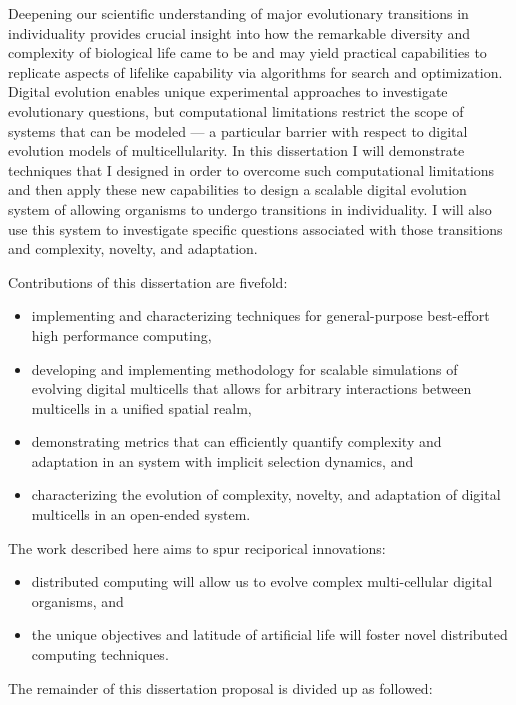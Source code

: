 Deepening our scientific understanding of major evolutionary transitions in individuality provides crucial insight into how the remarkable diversity and complexity of biological life came to be and may yield practical capabilities to replicate aspects of lifelike capability via algorithms for search and optimization.
Digital evolution enables unique experimental approaches to investigate evolutionary questions, but computational limitations restrict the scope of systems that can be modeled --- a particular barrier with respect to digital evolution models of multicellularity.
In this dissertation I will demonstrate techniques that I designed in order to overcome such computational limitations and then apply these new capabilities to design a scalable digital evolution system of allowing organisms to undergo transitions in individuality.
I will also use this system to investigate specific questions associated with those transitions and complexity, novelty, and adaptation.

Contributions of this dissertation are fivefold:
\begin{itemize}
\item implementing and characterizing techniques for general-purpose best-effort high performance computing,
\item developing and implementing methodology for scalable simulations of evolving digital multicells that allows for arbitrary interactions between multicells in a unified spatial realm,
\item demonstrating metrics that can efficiently quantify complexity and adaptation in an system with implicit selection dynamics, and
\item characterizing the evolution of complexity, novelty, and adaptation of digital multicells in an open-ended system.
\end{itemize}

The work described here aims to spur reciporical innovations:
\begin{itemize}
\item distributed computing will allow us to evolve complex multi-cellular digital organisms, and
\item the unique objectives and latitude of artificial life will foster novel distributed computing techniques.
\end{itemize}

The remainder of this dissertation proposal is divided up as followed:

